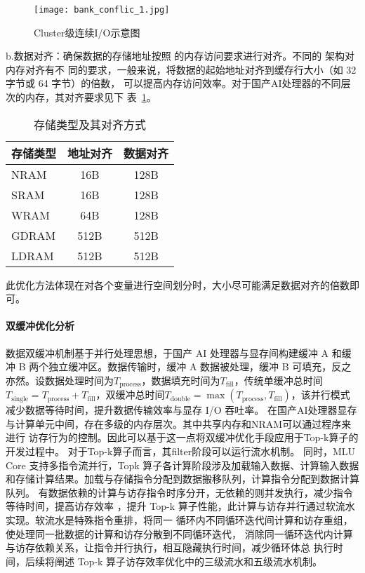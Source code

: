 \begin{figure}[ht]
    \centering
 \texttt{[image: bank\_conflic\_1.jpg]}
    \caption{Cluster级连续I/O示意图}
    \label{fig:bank_conflic}
\end{figure}





b.数据对齐：确保数据的存储地址按照 的内存访问要求进行对齐。不同的 架构对内存对齐有不
同的要求，一般来说，将数据的起始地址对齐到缓存行大小（如 32 字节或 64 字节）的倍数，
可以提高内存访问效率。对于国产AI处理器的不同层次的内存，其对齐要求见下
表~\ref{tab:alignment}。

\begin{table}
    \caption{存储类型及其对齐方式}
    \centering
    \begin{tabular}{lcc}
    \toprule
    存储类型 & 地址对齐 & 数据对齐 \\
    \midrule
    NRAM & 16B & 128B \\
    SRAM & 16B & 128B \\
    WRAM & 64B & 128B \\
    GDRAM & 512B & 512B \\
    LDRAM & 512B & 512B \\
    \bottomrule
    \end{tabular}

    \label{tab:alignment}
    \end{table}
此优化方法体现在对各个变量进行空间划分时，大小尽可能满足数据对齐的倍数即可。


\paragraph{双缓冲优化分析}

数据双缓冲机制基于并行处理思想，于国产 AI 处理器与显存间构建缓冲 A 和缓冲 B 两个独立缓冲区。数据传输时，缓冲 A 数据被处理，缓冲 B 可填充，反之亦然。设数据处理时间为\(T_{\text{process}}\)，数据填充时间为\(T_{\text{fill}}\)，传统单缓冲总时间\(T_{\text{single}} = T_{\text{process}} + T_{\text{fill}}\)，双缓冲总时间\(T_{\text{double}}=\max(T_{\text{process}}, T_{\text{fill}})\)，该并行模式减少数据等待时间，提升数据传输效率与显存 I/O 吞吐率。
在国产AI处理器显存与计算单元中间，存在多级的内存层次。其中共享内存和NRAM可以通过程序来进行
访存行为的控制。因此可以基于这一点将双缓冲优化手段应用于Top-k算子的开发过程中。
对于Top-k算子而言，其filter阶段可以运行流水机制。
同时，MLU Core 支持多指令流并行，Topk 算子各计算阶段涉及加载输入数据、计算输入数据
和存储计算结果。加载与存储指令分配到数据搬移队列，计算指令分配到数据计算队列。
有数据依赖的计算与访存指令时序分开，无依赖的则并发执行，减少指令等待时间，提高访存效率
，提升 Top-k 算子性能，此计算与访存并行通过软流水实现。软流水是特殊指令重排，将同一
循环内不同循环迭代间计算和访存重组，使处理同一批数据的计算和访存分散到不同循环迭代，
消除同一循环迭代内计算与访存依赖关系，让指令并行执行，相互隐藏执行时间，减少循环体总
执行时间，后续将阐述 Top-k 算子访存效率优化中的三级流水和五级流水机制。


